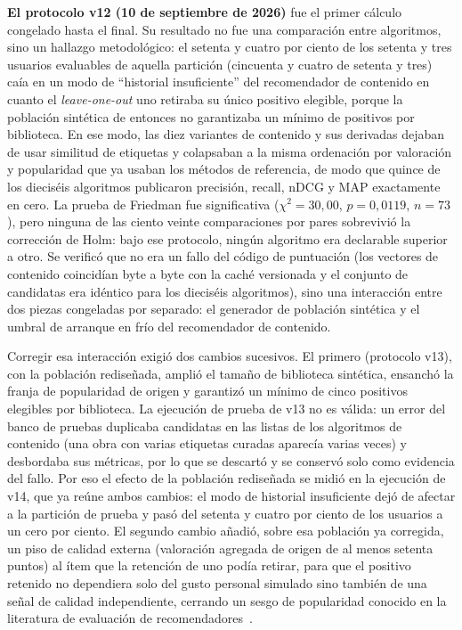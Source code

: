 \textbf{El protocolo v12 (10 de septiembre de 2026)} fue el primer cálculo congelado hasta el final. Su
resultado no fue una comparación entre algoritmos, sino un hallazgo metodológico: el
setenta y cuatro por ciento de los setenta y tres usuarios evaluables de aquella partición
(cincuenta y cuatro de setenta y tres) caía en un modo de \enquote{historial insuficiente} del
recomendador de contenido en cuanto el \emph{leave-one-out} uno retiraba su único positivo
elegible, porque la población sintética de entonces no garantizaba un mínimo de positivos
por biblioteca. En ese modo, las diez variantes de contenido y sus derivadas dejaban de usar
similitud de etiquetas y colapsaban a la misma ordenación por valoración y popularidad que ya
usaban los métodos de referencia, de modo que quince de los dieciséis algoritmos publicaron precisión,
recall, nDCG y MAP exactamente en cero. La prueba de Friedman fue significativa
(\(\chi^2=30{,}00\), \(p=0{,}0119\), \(n=73\)), pero ninguna de las ciento veinte
comparaciones por pares sobrevivió la corrección de Holm: bajo ese protocolo, ningún
algoritmo era declarable superior a otro. Se verificó que no era un fallo del código de
puntuación (los vectores de contenido coincidían byte a byte con la caché versionada y el
conjunto de candidatas era idéntico para los dieciséis algoritmos), sino una interacción entre
dos piezas congeladas por separado: el generador de población sintética y el umbral de
arranque en frío del recomendador de contenido.

Corregir esa interacción exigió dos cambios sucesivos. El primero (protocolo v13), con la población
rediseñada, amplió el tamaño de biblioteca sintética, ensanchó la franja de popularidad de
origen y garantizó un mínimo de cinco positivos elegibles por biblioteca. La ejecución de prueba de v13 no es
válida: un error del banco de pruebas duplicaba candidatas en las listas de los algoritmos de contenido (una obra
con varias etiquetas curadas aparecía varias veces) y desbordaba sus métricas, por lo que se descartó y se conservó
solo como evidencia del fallo. Por eso el efecto de la población rediseñada se midió en la ejecución de v14, que ya
reúne ambos cambios: el modo de historial insuficiente dejó de afectar a la partición de prueba y pasó del setenta y
cuatro por ciento de los usuarios a un cero por ciento. El segundo cambio añadió, sobre esa
población ya corregida, un piso de calidad externa (valoración agregada de origen de al menos
setenta puntos) al ítem que la retención de uno podía retirar, para que el positivo
retenido no dependiera solo del gusto personal simulado sino también de una señal de calidad
independiente, cerrando un sesgo de popularidad conocido en la literatura de evaluación de
recomendadores~\cite{cremonesi2010performance}.

